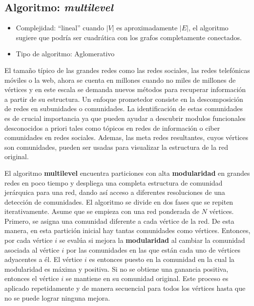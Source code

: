 \subsection{Algoritmo: \textit{multilevel}}\cite{Blondel2008FastNetworks} 
\begin{itemize}
\item Complejidad: ``lineal'' cuando  $|V|$ es aproximadamente $|E|$, el algoritmo sugiere que podría ser cuadrática con los grafos completamente conectados.
\item Tipo de algoritmo: Aglomerativo
% 
% 
\end{itemize}
El tamaño típico de las grandes redes como las redes sociales, las redes telefónicas móviles o la web, ahora se cuenta en millones cuando no miles de millones de vértices y en este escala se demanda nuevos métodos para recuperar información a partir de su estructura. Un enfoque prometedor consiste en la descomposición de redes en subunidades o comunidades. La identificación de estas comunidades es de crucial importancia ya que pueden ayudar a descubrir modulos funcionales desconocidos a priori tales como tópicos en redes de información o ciber comunidades en redes sociales. Ademas, las meta redes resultantes, cuyos vértices son comunidades, pueden ser usadas para visualizar la estructura de la red original.
 
El algoritmo \textbf{multilevel} encuentra particiones con alta \textbf{modularidad} en grandes redes en poco tiempo y despliega una completa estructura de comunidad jerárquica para una red, dando así acceso a diferentes resoluciones de una detección de comunidades. El algoritmo se divide en dos fases que se repiten iterativamente. Asume que se empieza con una red ponderada de $N$ vértices. Primero, se asigna una comunidad diferente a cada vértice de la red. De esta manera, en esta partición inicial hay tantas comunidades como vértices. Entonces, por cada vértice $i$ se evalúa si mejora la \textbf{modularidad} al cambiar la comunidad asociada al vértice $i$ por las comunidades en las que están cada uno de vértices adyacentes a él. El vértice $i$ es entonces puesto en la comunidad en la cual la modularidad es máxima y positiva. Si no se obtiene una ganancia positiva, entonces el vértice $i$ se mantiene en su comunidad original. Este proceso es aplicado repetidamente y de manera secuencial para todos los vértices hasta que no se puede lograr ninguna mejora.
 
